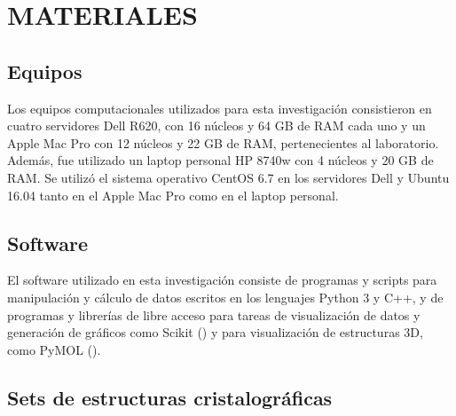 \newpage
\section*{MATERIALES}
\par{}
\subsection{Equipos}
\par
Los equipos computacionales utilizados para esta investigación consistieron en cuatro servidores Dell R620, con 16 núcleos y 64 GB de RAM cada uno y un Apple Mac Pro con 12 núcleos y 22 GB de RAM, pertenecientes al laboratorio. 
Además, fue utilizado un laptop personal HP 8740w con 4 núcleos y 20 GB de RAM. 
Se utilizó el sistema operativo CentOS 6.7 en los servidores Dell y Ubuntu 16.04 tanto en el Apple Mac Pro como en el laptop personal.
\subsection{Software}
\par
El software utilizado en esta investigación consiste de programas y scripts para manipulación y cálculo de datos escritos en los lenguajes Python 3 y C++, y de programas y librerías de libre acceso para tareas de visualización de datos y generación de gráficos como Scikit (\cite{Pedregosa2012}) y para visualización de estructuras 3D, como PyMOL (\cite{PyMOL}).

\subsection{Sets de estructuras cristalográficas}

